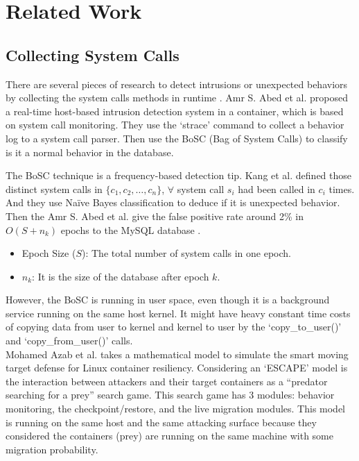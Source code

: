 \chapter{Related Work}

\section{Collecting System Calls}
There are several pieces of research to detect intrusions or unexpected behaviors
by collecting the system calls methods in runtime \cite{inproceedings,9307722,7809699,7796855}.
Amr S. Abed et al.\cite{inproceedings} proposed a real-time host-based intrusion
detection system in a container, which is based on system call monitoring. They use
the `strace' command to collect a behavior log to a system call parser. Then use the
BoSC (Bag of System Calls) \cite{1495942} to classify is it a normal behavior in
the database.

The BoSC technique is a frequency-based detection tip. Kang et al.\cite{1495942} defined
those distinct system calls in $\{c_1, c_2, \dots, c_n \}$, $\forall$ system call $s_i$
had been called in $c_i$ times. And they use Na\"ive Bayes classification to deduce if
it is unexpected behavior. Then the Amr S. Abed et al. give the false positive rate
around 2\% in $O(S+n_k)$ epochs to the MySQL database \cite{inproceedings}.
\begin{itemize}
    \item Epoch Size ($S$): The total number of system calls in one epoch.
    \item $n_k$: It is the size of the database after epoch $k$.
\end{itemize}
However, the BoSC is running in user space, even though it is a background service running
on the same host kernel. It might have heavy constant time costs of copying data from
user to kernel and kernel to user by the `copy\_to\_user()' and `copy\_from\_user()' calls.\\

Mohamed Azab et al.\cite{7809699,7796855} takes a mathematical model to simulate the
smart moving target defense for Linux container resiliency. Considering an `ESCAPE' model
is the interaction between attackers and their target containers as a “predator searching
for a prey” search game. This search game has 3 modules: behavior monitoring, the
checkpoint/restore, and the live migration modules.
This model is running on the same host and the same attacking surface because they considered
the containers (prey) are running on the same machine with some migration probability.


